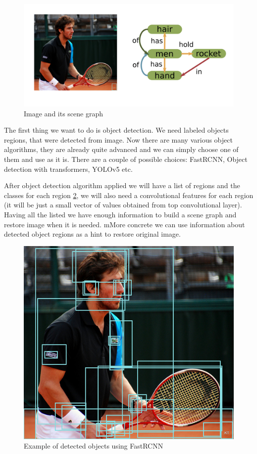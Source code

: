 \begin{figure}[!h]
    \centering
    \includegraphics[width=\textwidth]{figure/image-and-scene-graph.png}
    \caption{Image and its scene graph}
    \label{image-and-scene-graph}
\end{figure}

The first thing we want to do is object detection. We need labeled objects regions, that were detected from image. Now there are many various object algorithms, they are already quite advanced and we can simply choose one of them and use as it is. There are a couple of possible choices: FastRCNN, Object detection with transformers, YOLOv5 etc.

After object detection algorithm applied we will have a list of regions and the classes for each region \ref{objects-detected}, we will also need a convolutional features for each region (it will be just a small vector of values obtained from top convolutional layer). Having all the listed we have enough information to build a scene graph and restore image when it is needed. mMore concrete we can use information about detected object regions as a hint to restore original image.

\begin{figure}[!h]
    \centering
    \includegraphics[width=\textwidth]{figure/object-detected.png}
    \caption{Example of detected objects using FastRCNN}
    \label{objects-detected}
\end{figure}

